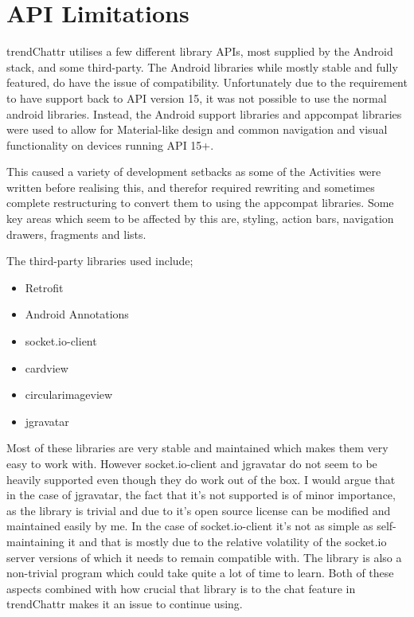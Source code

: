 \documentclass[11pt,english,numbers=endperiod,parskip=half]{scrartcl}
\begin{document}
\section{API Limitations}
  trendChattr utilises a few different library APIs, most supplied by the
  Android stack, and some third-party. The Android libraries while mostly stable
  and fully featured, do have the issue of compatibility. Unfortunately due to
  the requirement to have support back to API version 15, it was not possible to
  use the normal android libraries. Instead, the Android support libraries and
  appcompat libraries were used to allow for Material-like design and common
  navigation and visual functionality on devices running API 15+.

  This caused a variety of development setbacks as some of the Activities were
  written before realising this, and therefor required rewriting and sometimes
  complete restructuring to convert them to using the appcompat libraries. Some
  key areas which seem to be affected by this are, styling, action bars,
  navigation drawers, fragments and lists.

  The third-party libraries used include;
  \begin{itemize}
    \item{Retrofit}
    \item{Android Annotations}
    \item{socket.io-client}
    \item{cardview}
    \item{circularimageview}
    \item{jgravatar}
  \end{itemize}
  Most of these libraries are very stable and maintained which makes them very
  easy to work with. However socket.io-client and jgravatar do not seem to be
  heavily supported even though they do work out of the box. I would argue that
  in the case of jgravatar, the fact that it's not supported is of minor
  importance, as the library is trivial and due to it's open source license can
  be modified and maintained easily by me. In the case of socket.io-client it's
  not as simple as self-maintaining it and that is mostly due to the relative
  volatility of the socket.io server versions of which it needs to remain
  compatible with. The library is also a non-trivial program which could take
  quite a lot of time to learn. Both of these aspects combined with how crucial
  that library is to the chat feature in trendChattr makes it an issue to
  continue using.
\end{document}
